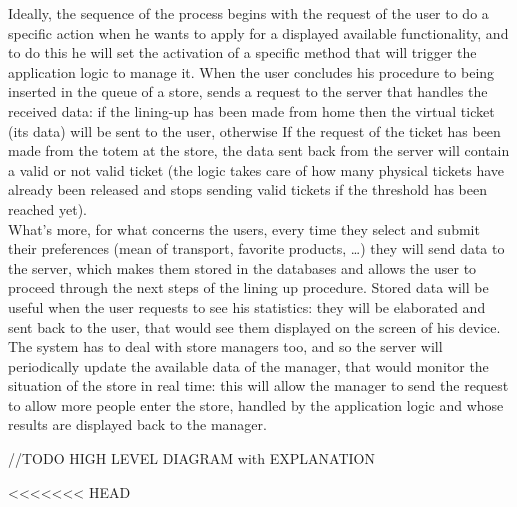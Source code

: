 \documentclass[]{article}
\begin{document}
\begin{paragraph}
					
					Ideally, the sequence of the process begins with the request of the user to do a specific action when he wants to apply for a displayed available functionality, and to do this he will set the activation of a specific method that will trigger the application logic to manage it.
When the user concludes his procedure to being inserted in the queue of a store, sends a request to the server that handles the received data: if the lining-up has been made from home then the virtual ticket (its data) will be sent to the user, otherwise If the request of the ticket has been made from the totem at the store, the data sent back from the server will contain a valid or not valid ticket (the logic takes care of how many physical tickets have already been released and stops  sending valid tickets if the threshold has been reached yet).\\
					\newline
What’s more, for what concerns the users, every time they select and submit their preferences (mean of transport, favorite products, …) they will send data to the server, which makes them stored in the databases and allows the user to proceed through the next steps of the lining up procedure. Stored data will be useful when the user requests to see his statistics: they will be elaborated and sent back to the user, that would see them displayed on the screen of his device.\\
					\newline
The system has to deal with store managers too, and so the server will periodically update the available data of the manager, that would monitor the situation of the store in real time: this will allow the manager to send the request to allow more people enter the store, handled by the application logic and whose results are displayed back to the manager. \newline

\large //TODO HIGH LEVEL DIAGRAM with EXPLANATION
\newpage
				
				\end {paragraph}
				
<<<<<<< HEAD
\end{document}

